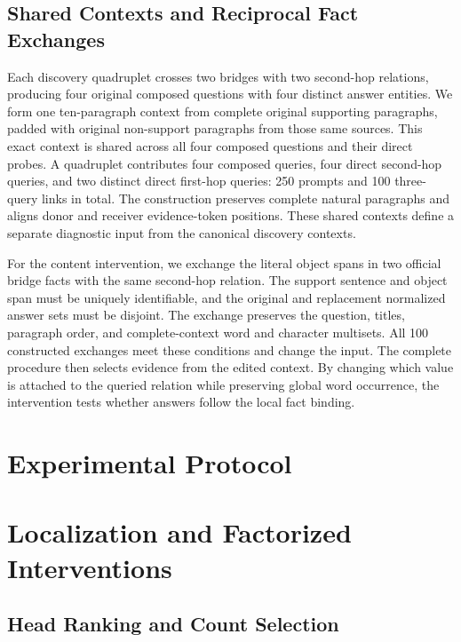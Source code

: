 \subsection{Shared Contexts and Reciprocal Fact Exchanges}

Each discovery quadruplet crosses two bridges with two second-hop relations, producing four original composed questions with four distinct answer entities. We form one ten-paragraph context from complete original supporting paragraphs, padded with original non-support paragraphs from those same sources. This exact context is shared across all four composed questions and their direct probes. A quadruplet contributes four composed queries, four direct second-hop queries, and two distinct direct first-hop queries: 250 prompts and 100 three-query links in total. The construction preserves complete natural paragraphs and aligns donor and receiver evidence-token positions. These shared contexts define a separate diagnostic input from the canonical discovery contexts.

For the content intervention, we exchange the literal object spans in two official bridge facts with the same second-hop relation. The support sentence and object span must be uniquely identifiable, and the original and replacement normalized answer sets must be disjoint. The exchange preserves the question, titles, paragraph order, and complete-context word and character multisets. All 100 constructed exchanges meet these conditions and change the input. The complete procedure then selects evidence from the edited context. By changing which value is attached to the queried relation while preserving global word occurrence, the intervention tests whether answers follow the local fact binding.

\section{Experimental Protocol}
\label{app:protocol}


\section{Localization and Factorized Interventions}
\label{app:interventions}

\subsection{Head Ranking and Count Selection}


